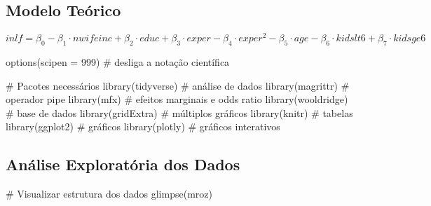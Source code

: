 \documentclass[
  letterpaper,
  DIV=11,
  numbers=noendperiod]{scrartcl}
\newenvironment{Shaded}{\begin{snugshade}}{\end{snugshade}}
\newcommand{\AttributeTok}[1]{\textcolor[rgb]{0.40,0.45,0.13}{#1}}
\newcommand{\CommentTok}[1]{\textcolor[rgb]{0.37,0.37,0.37}{#1}}
\newcommand{\DecValTok}[1]{\textcolor[rgb]{0.68,0.00,0.00}{#1}}
\newcommand{\FunctionTok}[1]{\textcolor[rgb]{0.28,0.35,0.67}{#1}}
\newcommand{\NormalTok}[1]{\textcolor[rgb]{0.00,0.23,0.31}{#1}}
\begin{document}
\subsection{Modelo Teórico}\label{modelo-teuxf3rico}

\[inlf = \beta_0 - \beta_1 \cdot nwifeinc + \beta_2 \cdot educ + \beta_3 \cdot exper - \beta_4 \cdot exper^2 - \beta_5 \cdot age - \beta_6 \cdot kidslt6 + \beta_7 \cdot kidsge6\]

\begin{Shaded}
\begin{Highlighting}[]
\FunctionTok{options}\NormalTok{(}\AttributeTok{scipen =} \DecValTok{999}\NormalTok{) }\CommentTok{\# desliga a notação científica}

\CommentTok{\# Pacotes necessários}
\FunctionTok{library}\NormalTok{(tidyverse)    }\CommentTok{\# análise de dados}
\FunctionTok{library}\NormalTok{(magrittr)     }\CommentTok{\# operador pipe}
\FunctionTok{library}\NormalTok{(mfx)          }\CommentTok{\# efeitos marginais e odds ratio}
\FunctionTok{library}\NormalTok{(wooldridge)   }\CommentTok{\# base de dados}
\FunctionTok{library}\NormalTok{(gridExtra)    }\CommentTok{\# múltiplos gráficos}
\FunctionTok{library}\NormalTok{(knitr)        }\CommentTok{\# tabelas}
\FunctionTok{library}\NormalTok{(ggplot2)      }\CommentTok{\# gráficos}
\FunctionTok{library}\NormalTok{(plotly)       }\CommentTok{\# gráficos interativos}
\end{Highlighting}
\end{Shaded}

\subsection{Análise Exploratória dos
Dados}\label{anuxe1lise-exploratuxf3ria-dos-dados}

\begin{Shaded}
\begin{Highlighting}[]
\CommentTok{\# Visualizar estrutura dos dados}
\FunctionTok{glimpse}\NormalTok{(mroz)}
\end{Highlighting}
\end{Shaded}
\end{document}
